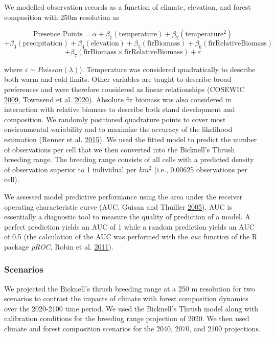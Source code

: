 \documentclass[12pt]{article}
\begin{document}
We modelled observation records as a function of climate, elevation, and
forest composition with 250m resolution as

\[
\text{Presence Points} = \alpha + \beta_1(\text{temperature}) + \beta_2(\text{temperature}^{2})
\] \[
+ \beta_3(\text{precipitation}) + \beta_4(\text{elevation}) + \beta_5(\text{firBiomass}) + \beta_6(\text{firRelativeBiomass})
\] \[
+ \beta_7(\text{firBiomass} \times \text{firRelativeBiomass}) + \varepsilon
\]

where \(\varepsilon \sim Poisson(\lambda)\)). Temperature was considered
quadratically to describe both warm and cold limits. Other variables are
taught to describe broad preferences and were therefore considered as
linear relationships (COSEWIC
\protect\hyperlink{ref-cosewic_cosewic_2009}{2009}, Townsend et al.
\protect\hyperlink{ref-billerman_bicknells_2020}{2020}). Absolute fir
biomass was also considered in interaction with relative biomass to
describe both stand development and composition. We randomly positioned
quadrature points to cover most environmental variability and to
maximize the accuracy of the likelihood estimation (Renner et al.
\protect\hyperlink{ref-renner_point_2015}{2015}). We used the fitted
model to predict the number of observations per cell that we then
converted into the Bicknell's Thrush breeding range. The breeding range
consists of all cells with a predicted density of observation superior
to 1 individual per \(km^2\) (i.e., 0.00625 observations per cell).

We assessed model predictive performance using the area under the
receiver operating characteristic curve (AUC, Guisan and Thuiller
\protect\hyperlink{ref-guisan_predicting_2005}{2005}). AUC is
essentially a diagnostic tool to measure the quality of prediction of a
model. A perfect prediction yields an AUC of 1 while a random prediction
yields an AUC of 0.5 (the calculation of the AUC was performed with the
\emph{auc} function of the R package \emph{pROC}, Robin et al.
\protect\hyperlink{ref-robin_proc_2011}{2011}).

\hypertarget{scenarios}{%
\subsubsection{Scenarios}\label{scenarios}}

We projected the Bicknell's thrush breeding range at a 250 m resolution
for two scenarios to contrast the impacts of climate with forest
composition dynamics over the 2020-2100 time period. We used the
Bicknell's Thrush model along with calibration conditions for the
breeding range projection of 2020. We then used climate and forest
composition scenarios for the 2040, 2070, and 2100 projections.
\end{document}

